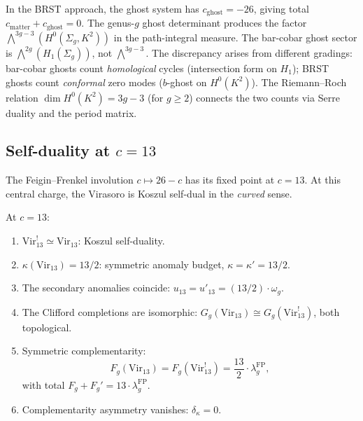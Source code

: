 \begin{remark}
\label{rem:g9-brst-comparison}
In the BRST approach, the ghost system has $c_{\mathrm{ghost}} = -26$,
giving total $c_{\mathrm{matter}} + c_{\mathrm{ghost}} = 0$. The
genus-$g$ ghost determinant produces the factor
$\bigwedge^{3g-3}(H^0(\Sigma_g, K^2))$ in the path-integral measure.
The bar-cobar ghost sector is $\bigwedge^{2g}(H_1(\Sigma_g))$, not
$\bigwedge^{3g-3}$. The discrepancy arises from different
gradings: bar-cobar ghosts count \emph{homological} cycles
(intersection form on $H_1$); BRST ghosts count \emph{conformal}
zero modes ($b$-ghost on $H^0(K^2)$). The Riemann--Roch relation
$\dim H^0(K^2) = 3g-3$ (for $g \geq 2$) connects the two counts
via Serre duality and the period matrix.
\end{remark}

%
%

\subsection{Self-duality at $c = 13$}
\label{subsec:self-duality-c13}

The Feigin--Frenkel involution $c \mapsto 26 - c$ has its fixed point
at $c = 13$. At this central charge, the Virasoro is Koszul self-dual
in the \emph{curved} sense.

\begin{theorem}[Virasoro self-duality at $c = 13$;
\ClaimStatusProvedHere]
\label{thm:vir-self-duality-c13}
At $c = 13$:
\begin{enumerate}[label=\textup{(\roman*)}]
\item $\mathrm{Vir}_{13}^! \simeq \mathrm{Vir}_{13}$: Koszul
self-duality.

\item $\kappa(\mathrm{Vir}_{13}) = 13/2$: symmetric anomaly budget,
$\kappa = \kappa' = 13/2$.

\item The secondary anomalies coincide:
$u_{13} = u'_{13} = (13/2) \cdot \omega_g$.

\item The Clifford completions are isomorphic:
$G_g(\mathrm{Vir}_{13}) \cong G_g(\mathrm{Vir}_{13}^!)$, both
topological.

\item Symmetric complementarity:
\begin{equation}\label{eq:g9-c13-complementarity}
F_g(\mathrm{Vir}_{13}) = F_g(\mathrm{Vir}_{13}^!)
= \frac{13}{2} \cdot \lambda_g^{\mathrm{FP}},
\end{equation}
with total $F_g + F_g' = 13 \cdot \lambda_g^{\mathrm{FP}}$.

\item Complementarity asymmetry vanishes: $\delta_\kappa = 0$.
\end{enumerate}
\end{theorem}

